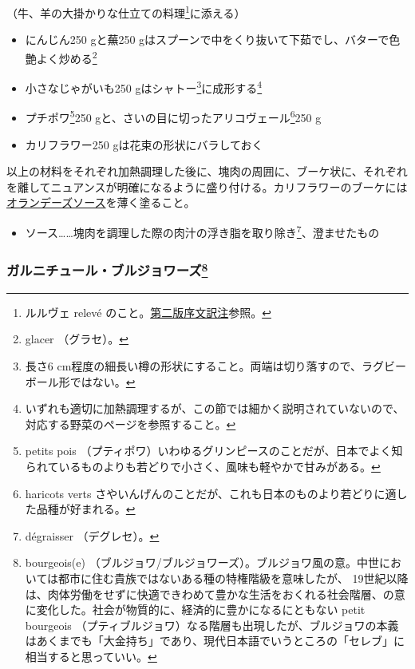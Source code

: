 \begin{recette}

（牛、羊の大掛かりな仕立ての料理\footnote{ルルヴェ relevé
  のこと。\protect\hyperlink{releve}{第二版序文訳注}参照。}に添える）

\begin{itemize}
\item
  にんじん250 gと蕪250
  gはスプーンで中をくり抜いて下茹でし、バターで色艶よく炒める\footnote{glacer
    （グラセ）。}
\item
  小さなじゃがいも250 gはシャトー\footnote{長さ6
    cm程度の細長い樽の形状にすること。両端は切り落すので、ラグビーボール形ではない。}に成形する\footnote{いずれも適切に加熱調理するが、この節では細かく説明されていないので、対応する野菜のページを参照すること。}
\item
  プチポワ\footnote{petits pois
    （プティポワ）いわゆるグリンピースのことだが、日本でよく知られているものよりも若どりで小さく、風味も軽やかで甘みがある。}250
  gと、さいの目に切ったアリコヴェール\footnote{haricots verts
    さやいんげんのことだが、これも日本のものより若どりに適した品種が好まれる。}250
  g
\item
  カリフラワー250 gは花束の形状にバラしておく
\end{itemize}

以上の材料をそれぞれ加熱調理した後に、塊肉の周囲に、ブーケ状に、それぞれを離してニュアンスが明確になるように盛り付ける。カリフラワーのブーケには\protect\hyperlink{sauce-hollandaise}{オランデーズソース}を薄く塗ること。

\begin{itemize}
\tightlist
\item
  ソース\ldots{}\ldots{}塊肉を調理した際の肉汁の浮き脂を取り除き\footnote{dégraisser
    （デグレセ）。}、澄ませたもの
\end{itemize}

\hypertarget{garniture-bourgeoise}{%
\subsubsection[ガルニチュール・ブルジョワーズ]{\texorpdfstring{ガルニチュール・ブルジョワーズ\footnote{bourgeois(e)
  （ブルジョワ/ブルジョワーズ）。ブルジョワ風の意。中世においては都市に住む貴族ではないある種の特権階級を意味したが、
  19世紀以降は、肉体労働をせずに快適できわめて豊かな生活をおくれる社会階層、の意に変化した。社会が物質的に、経済的に豊かになるにともない
  petit bourgeois
  （プティブルジョワ）なる階層も出現したが、ブルジョワの本義はあくまでも「大金持ち」であり、現代日本語でいうところの「セレブ」に相当すると思っていい。}}{ガルニチュール・ブルジョワーズ}}\label{garniture-bourgeoise}}


\end{recette}
